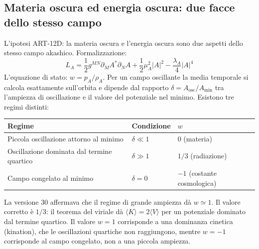 \subsection{Materia oscura ed energia oscura: due facce dello stesso campo}
L'ipotesi ART-12D: la materia oscura e l'energia oscura sono due aspetti dello stesso campo akashico. Formalizzazione:
\begin{equation}
L_A = \frac{1}{2} g^{MN} \partial_M A^* \partial_N A + \frac{1}{2} \mu_A^2 |A|^2 - \frac{\lambda_A}{4} |A|^4
\end{equation}
L'equazione di stato: $w = p_A / \rho_A$. Per un campo oscillante la media temporale si calcola esattamente sull'orbita e dipende dal rapporto $\delta = A_{\text{osc}}/A_{\min}$ tra l'ampiezza di oscillazione e il valore del potenziale nel minimo. Esistono tre regimi distinti:
\begin{center}
\begin{tabular}{@{}lll@{}}
\toprule
\textbf{Regime} & \textbf{Condizione} & $w$ \\ \midrule
Piccola oscillazione attorno al minimo & $\delta \ll 1$ & $0$ (materia) \\
Oscillazione dominata dal termine quartico & $\delta \gg 1$ & $1/3$ (radiazione) \\
Campo congelato al minimo & $\delta = 0$ & $-1$ (costante cosmologica) \\ \bottomrule
\end{tabular}
\end{center}
La versione 30 affermava che il regime di grande ampiezza dà $w \simeq 1$. Il valore corretto è $1/3$: il teorema del viriale dà $\langle K \rangle = 2\langle V \rangle$ per un potenziale dominato dal termine quartico. Il valore $w = 1$ corrisponde a una dominanza cinetica (kination), che le oscillazioni quartiche non raggiungono, mentre $w = -1$ corrisponde al campo congelato, non a una piccola ampiezza.
